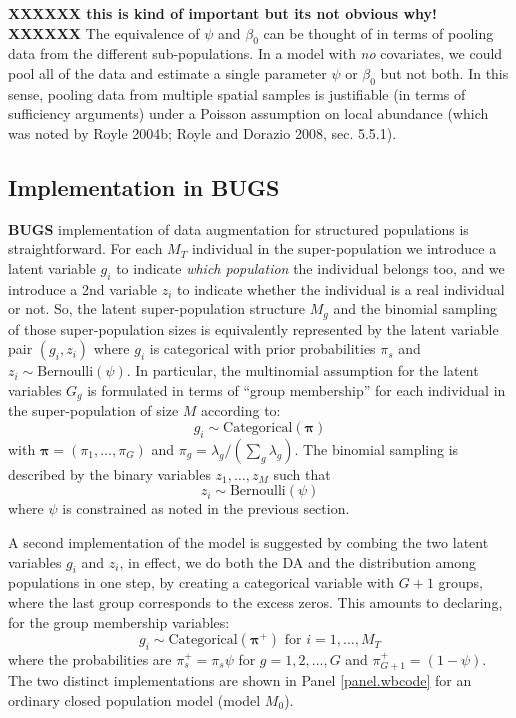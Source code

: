 {\bf XXXXXX this is kind of important but its not obvious why! XXXXXX}
The equivalence of $\psi$ and $\beta_{0}$ can be thought of in terms
of pooling data from the different sub-populations. In a model with
{\it no} covariates, we could pool all of the data and estimate a
single parameter $\psi$ or $\beta_0$ but not both. In this sense,
pooling data from multiple spatial samples is justifiable (in terms of
sufficiency arguments) under a Poisson assumption on local abundance
(which was noted by Royle 2004b; Royle and Dorazio 2008, sec. 5.5.1).


\subsection{Implementation in BUGS}

{\bf BUGS} implementation of data augmentation for structured
populations is straightforward. 
For each $M_{T}$ individual in the
super-population we introduce a latent variable $g_{i}$ to indicate
{\it which population} the individual belongs too, and we introduce a 2nd
variable $z_{i}$ to indicate whether the individual is a real
individual or not.  So, the latent super-population structure $M_{g}$
and the binomial sampling of those super-population sizes is
equivalently represented by the latent variable pair $(g_{i},z_{i})$
where $g_{i}$ is categorical with prior probabilities $\pi_{s}$ and
$z_{i} \sim \mbox{Bernoulli}(\psi)$.  In particular, the multinomial assumption
for the latent variables $G_{g}$ is formulated in terms of ``group
membership'' for each individual in the super-population of size $M$
according to:
\[
 g_{i} \sim \mbox{Categorical}\left( {\bm \pi} \right)
\]
with ${\bm \pi} = (\pi_{1}, \ldots, \pi_{G})$ and $\pi_{g} =
\lambda_{g}/(\sum_{g} \lambda_{g})$.  The binomial sampling is
described by the binary variables $z_{1},\ldots,z_{M}$ such that
\[
 z_{i} \sim \mbox{Bernoulli}(\psi)
\]
where $\psi$ is constrained as noted in the previous section.  

A
second implementation of the model is suggested by combing the two
latent variables $g_{i}$ and $z_{i}$,
in effect, we do both the DA and the distribution among populations in
one step,
by creating a categorical variable with $G+1$
groups, where the last group corresponds to the excess zeros. 
This amounts to declaring, for the group membership variables:  
\begin{equation}
g_{i}  \sim \mbox{Categorical}( {\bm \pi}^{+} ) \mbox{ for
  $i=1,\ldots,M_{T}$}  \label{eq.parm1c}
\end{equation}
where 
the probabilities are $\pi_{s}^{+} = \pi_{s} \psi$
for $g=1,2,\ldots,G$ and $\pi_{G+1}^{+} = (1-\psi)$.
The two distinct implementations are shown in Panel \ref{panel.wbcode}
for an ordinary closed population model (model $M_{0}$).

